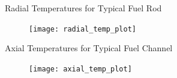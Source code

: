 \begin{frame}{Radial Temperatures for Typical Fuel Rod}
  \begin{figure}
    \centering
    \texttt{[image: radial\_temp\_plot]}
    \label{fig:radial_temp_plot}
  \end{figure}
\end{frame}

\begin{frame}{Axial Temperatures for Typical Fuel Channel}
      \begin{figure}
        \centering
        \texttt{[image: axial\_temp\_plot]}
        \label{fig:axial_temp_plot}
      \end{figure}
\end{frame}


